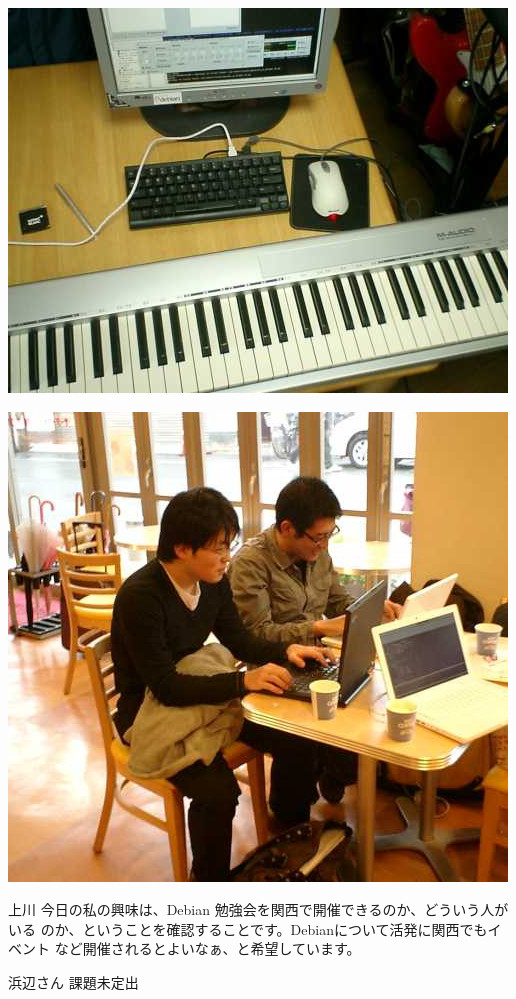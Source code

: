 \documentclass[cjk,dvipdfmx]{beamer}
\begin{document}
\begin{frame}
 \includegraphics[width=0.8\hsize]{image200611/keystation.jpg}
\end{frame}

\begin{frame}
 \includegraphics[width=0.8\hsize]{image200611/hack.jpg}
\end{frame}

\begin{frame}{上川}
今日の私の興味は、Debian 勉強会を関西で開催できるのか、どういう人がいる
のか、ということを確認することです。Debianについて活発に関西でもイベント
など開催されるとよいなぁ、と希望しています。
\end{frame}

\begin{frame}{浜辺さん}
課題未定出
\end{frame}
\end{document}
